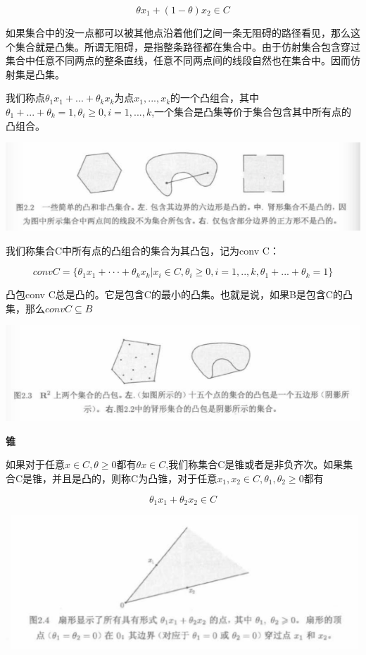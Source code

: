\documentclass{ctexart}
\begin{document}
	\[\theta x_1 + (1-\theta)x_2 \in C\]
	
	如果集合中的没一点都可以被其他点沿着他们之间一条无阻碍的路径看见，那么这个集合就是凸集。所谓无阻碍，是指整条路径都在集合中。由于仿射集合包含穿过集合中任意不同两点的整条直线，任意不同两点间的线段自然也在集合中。{\color{red}因而仿射集是凸集。}
	
	我们称点\(\theta_1x_1 + ...+\theta_kx_k\)为点\(x_1,...,x_k\)的一个凸组合，其中\(\theta_1+...+\theta_k = 1, \theta_i \geq 0, i = 1,...,k\),一个集合是凸集等价于集合包含其中所有点的凸组合。
	
	\includegraphics[width=1\linewidth]{pic/pic2_2}
	
	我们称集合C中所有点的凸组合的集合为其凸包，记为conv C：
	
	\[conv C = \{\theta_1 x_1 + ···+\theta_k x_k|x_i \in C, \theta_i \geq 0, i =1,..,k, \theta_1+...+\theta_k=1\}\]
	
	凸包conv C总是凸的。它是包含C的最小的凸集。也就是说，如果B是包含C的凸集，那么\(conv C \subseteq B\)
	
	\includegraphics[width=1\linewidth]{pic/pic2_3}
	
	\textbf{锥}
	
	如果对于任意\(x \in C, \theta \geq 0\)都有\(\theta x \in C\),我们称集合C是锥或者是非负齐次。如果集合C是锥，并且是凸的，则称C为凸锥，对于任意\(x_1, x_2 \in C, \theta_1, \theta_2 \geq 0\)都有
	
	\[\theta_1 x_1 + \theta_2 x_2 \in C\]
	
	\includegraphics[width=1\linewidth]{pic/pic2_4}
	
\end{document}
